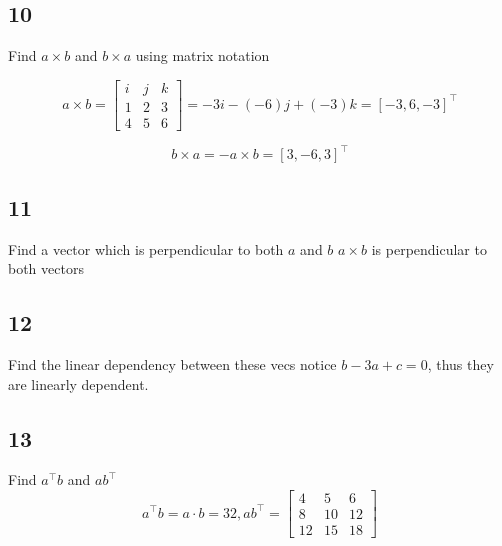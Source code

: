 \documentclass{article}
\begin{document}
\subsection*{10}
\begin{myleftlinebox}
    Find \(a\times b\) and \(b\times a\)
    \tcblower
    using matrix notation

    \[
        a\times b = \begin{bmatrix}
            i & j & k\\
            1 & 2 & 3\\
            4 & 5 & 6
        \end{bmatrix} = -3i-(-6)j + (-3)k =[-3,6,-3]^\top
    \]  

    \[
    b\times a = - a\times b = [3,-6,3]^\top
    \]  
\end{myleftlinebox}



\subsection*{11}
\begin{myleftlinebox}
    Find a vector which is perpendicular to both \(a \) and \(b\)
    \tcblower
    \(a\times b\) is perpendicular to both vectors
\end{myleftlinebox}



\subsection*{12}
\begin{myleftlinebox}
    Find the linear dependency between these vecs
    \tcblower
    notice \(b-3a+c = 0\), thus they are linearly dependent.

\end{myleftlinebox}


\subsection*{13}
\begin{myleftlinebox}
    Find \(a^\top b\) and \(ab^\top\)
    \tcblower
    \[
        a^\top b = a\cdot b = 32, ab^\top = \begin{bmatrix}
            4 & 5 & 6\\
            8 & 10 & 12\\
            12 & 15 & 18
        \end{bmatrix}
    \]

\end{myleftlinebox}
\end{document}

